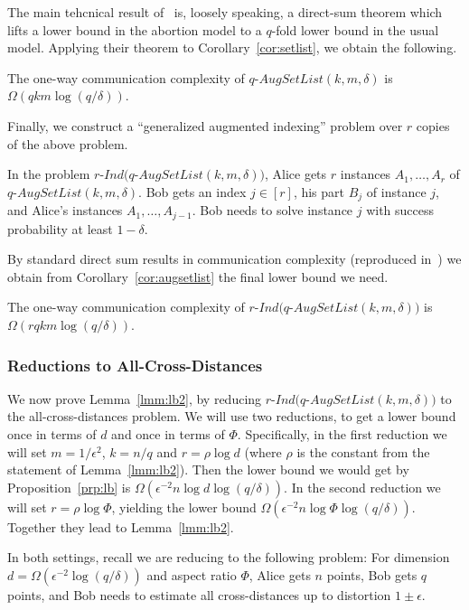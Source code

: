 The main tehcnical result of~\cite{molinaro2013beating} is, loosely speaking, a direct-sum theorem which lifts a lower bound in the abortion model to a $q$-fold lower bound in the usual model.
Applying their theorem to Corollary~\ref{cor:setlist}, we obtain the following.
\begin{corollary}\label{cor:augsetlist}
The one-way communication complexity of $q$-$AugSetList(k,m,\delta)$ is $\Omega(qkm\log(q/\delta))$.
\end{corollary}

Finally, we construct a ``generalized augmented indexing'' problem over $r$ copies of the above problem.
\begin{definition}
In the problem $r$-$Ind(q$-$AugSetList(k,m,\delta))$,
Alice gets $r$ instances $A_1,\ldots,A_r$ of $q$-$AugSetList(k,m,\delta)$.
Bob gets an index $j\in[r]$, his part $B_j$ of instance $j$, and Alice's instances $A_1,\ldots,A_{j-1}$.
Bob needs to solve instance $j$ with success probability at least $1-\delta$.
\end{definition}

By standard direct sum results in communication complexity (reproduced in~\cite{molinaro2013beating}) we obtain from Corollary~\ref{cor:augsetlist} the final lower bound we need.
\begin{proposition}\label{prp:lb}
The one-way communication complexity of $r$-$Ind(q$-$AugSetList(k,m,\delta))$ is $\Omega(rqkm\log(q/\delta))$.
\end{proposition}

\subsubsection{Reductions to All-Cross-Distances}

We now prove Lemma~\ref{lmm:lb2}, by reducing $r$-$Ind(q$-$AugSetList(k,m,\delta))$ to the all-cross-distances problem.
We will use two reductions, to get a lower bound once in terms of $d$ and once in terms of $\Phi$.
Specifically, in the first reduction
we will set $m=1/\epsilon^2$, $k=n/q$ and $r=\rho\log d$ (where $\rho$ is the constant from the statement of Lemma~\ref{lmm:lb2}). Then the lower bound we would get by Proposition~\ref{prp:lb} is $\Omega\left(\epsilon^{-2}n\log d\log(q/\delta)\right)$.
In the second reduction we will set $r=\rho\log\Phi$, yielding the lower bound $\Omega\left(\epsilon^{-2}n\log\Phi\log(q/\delta)\right)$.
Together they lead to Lemma~\ref{lmm:lb2}.

In both settings, recall we are reducing to the following problem: For dimension $d=\Omega(\epsilon^{-2}\log(q/\delta))$ and aspect ratio $\Phi$, Alice gets $n$ points, Bob gets $q$ points, and Bob needs to estimate all cross-distances up to distortion $1\pm\epsilon$.


